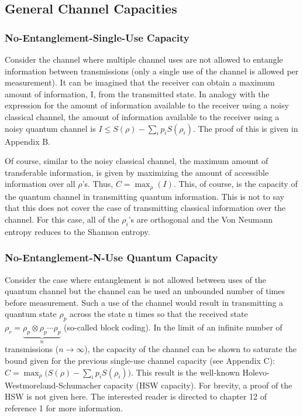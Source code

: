 \documentclass[letterpaper,twoside,10pt]{article}
\begin{document}
\subsection{General Channel Capacities}

\subsubsection{No-Entanglement-Single-Use Capacity}

Consider the channel where multiple channel uses are not allowed to entangle information between transmissions (only a single use of the channel is allowed per measurement). It can be imagined that the receiver can obtain a maximum amount of information, I, from the transmitted state. In analogy with the expression for the amount of information available to the receiver using a noisy classical channel, the amount of information available to the receiver using a noisy quantum channel is $I\le S(\rho)-\sum_ip_iS(\rho_i)$. The proof of this is given in Appendix B. 

Of course, similar to the noisy classical channel, the maximum amount of transferable information, is given by maximizing the amount of accessible information over all $\rho$'s. Thus, $C = \max_{\rho}(I)$. This, of course, is the capacity of the quantum channel in transmitting quantum information. This is not to say that this does not cover the case of transmitting classical information over the channel. For this case, all of the $\rho_i$'s are orthogonal and the Von Neumann entropy reduces to the Shannon entropy.

\subsubsection{No-Entanglement-N-Use Quantum Capacity}

Consider the case where entanglement is not allowed between uses of the quantum channel but the channel can be used an unbounded number of times before measurement. Such a use of the channel would result in transmitting a quantum state $\rho_p$ across the state n times so that the received state $\rho_r = \underbrace{\rho_p\otimes\rho_p\cdots\rho_p}_{n}$ (so-called block coding). In the limit of an infinite number of transmissions ($n\rightarrow\infty$), the capacity of the channel can be shown to saturate the bound given for the previous single-use channel capacity (see Appendix C): $C = \max_{\rho}\big(S(\rho)-\sum_ip_iS(\rho_i)\big)$. This result is the well-known Holevo-Westmoreland-Schumacher capacity (HSW capacity). For brevity, a proof of the HSW is not given here. The interested reader is directed to chapter 12 of reference 1 for more information.
\end{document}
